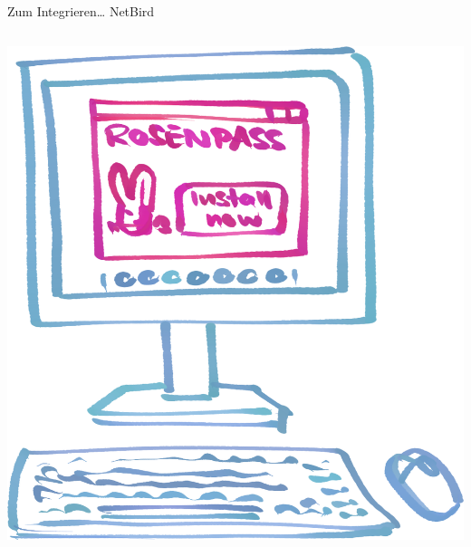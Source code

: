 \documentclass{rosenpass-beamer}
\begin{document}
\begin{frame}{Zum Integrieren… NetBird}
\begin{columns}[c]
\begin{column}{0.2\textwidth}
\medskip
\includegraphics[width=\linewidth]{graphics/Illu-install.png}

\end{column}
\end{columns}
\end{frame}
\end{document}
